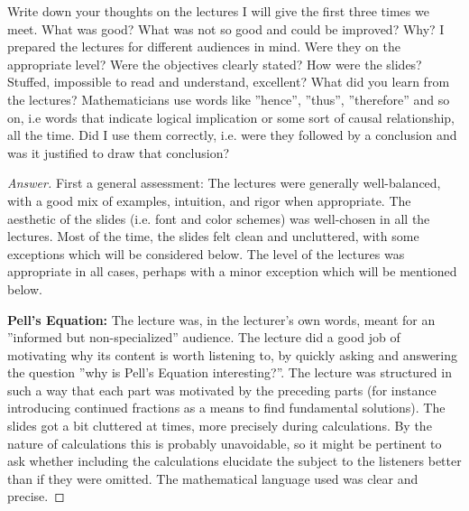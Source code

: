 \begin{assignment}
  Write down your thoughts on the lectures I will give the first three times
we meet. What was good? What was not so good and could be improved?
Why? I prepared the lectures for different audiences in mind. Were they
on the appropriate level? Were the objectives clearly stated? How were
the slides? Stuffed, impossible to read and understand, excellent? What
did you learn from the lectures? Mathematicians use words like ”hence”,
”thus”, ”therefore” and so on, i.e words that indicate logical implication
or some sort of causal relationship, all the time. Did I use them correctly,
i.e. were they followed by a conclusion and was it justified to draw that
conclusion?
\end{assignment}

\begin{proof}[Answer]
  First a general assessment: The lectures were generally well-balanced, with a good mix of examples, intuition, and rigor when appropriate. The aesthetic of the slides (i.e. font and color schemes) was well-chosen in all the lectures. Most of the time, the slides felt clean and uncluttered, with some exceptions which will be considered below. The level of the lectures was appropriate in all cases, perhaps with a minor exception which will be mentioned below.

\textbf{Pell's Equation:} The lecture was, in the lecturer's own words, meant for an ''informed but non-specialized'' audience. The lecture did a good job of motivating why its content is worth listening to, by quickly asking and answering the question ''why is Pell's Equation interesting?''. The lecture was structured in such a way that each part was motivated by the preceding parts (for instance introducing continued fractions as a means to find fundamental solutions). The slides got a bit cluttered at times, more precisely during calculations. By the nature of calculations this is probably unavoidable, so it might be pertinent to ask whether including the calculations elucidate the subject to the listeners better than if they were omitted. The mathematical language used was clear and precise.


\end{proof}
